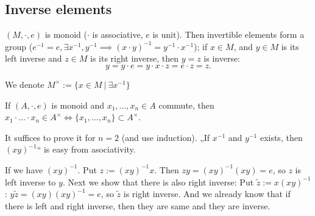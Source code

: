 \documentclass[12pt]{article}					%
\begin{document}
\subsection{Inverse elements}
\begin{definice}
	$(M, ·, e)$ is monoid ($·$ is associative, $e$ is unit). Then invertible elements form a group ($e^{-1} = e, \exists x^{-1}, y^{-1} \implies (x·y)^{-1} = y^{-1}·x^{-1}$); if $x \in M$, and $y \in M$ is its left inverse and $z \in M$ is its right inverse, then $y = z$ is inverse:
	$$ y = y·e = y·x·z = e·z = z. $$

	We denote $M^\times := \{x \in M\ |\ \exists x^{-1}\}$
\end{definice}


\begin{tvrzeni}
	If $(A, ·, e)$ is monoid and $x_1, …, x_n \in A$ commute, then $x_1·…·x_n \in A^\times \Leftrightarrow \{x_1, …, x_n\} \subset A^\times$.

	\begin{dukazin}
		It suffices to prove it for $n=2$ (and use induction). „If $x^{-1}$ and $y^{-1}$ exists, then $(xy)^{-1}$“ is easy from asociativity.

		If we have $(xy)^{-1}$. Put $z:= (xy)^{-1}x$. Then $zy = (xy)^{-1}(xy) = e$, so $z$ is left inverse to $y$. Next we show that there is also right inverse: Put $\tilde z := x(xy)^{-1}$: $y\tilde z = (xy)(xy)^{-1} = e$, so $\tilde z$ is right inverse. And we already know that if there is left and right inverse, then they are same and they are inverse.
	\end{dukazin}
\end{tvrzeni}
\end{document}

